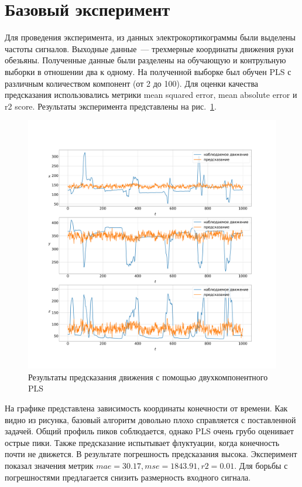 \section{Базовый эксперимент}
Для проведения эксперимента, из данных электрокортикограммы были выделены частоты сигналов. Выходные данные~--- трехмерные координаты движения руки обезьяны. Полученные данные были разделены на обучающую и контрульную выборки в отношении два к одному. На полученной выборке был обучен PLS с различным количеством компонент (от 2 до 100). Для оценки качества предсказания использовались метрики mean squared error, mean absolute error и r2 score. Результаты эксперимента представлены на рис.~\ref{fig:baseAlgo}.
\begin{figure}
  \begin{center}
    \includegraphics[width=\textwidth]{base_algo.pdf}
    \caption{Результаты предсказания движения с помощью двухкомпонентного PLS}
    \label{fig:baseAlgo}
  \end{center}
\end{figure}
На графике представлена зависимость координаты конечности от времени. Как видно из рисунка, базовый алгоритм довольно плохо справляется с поставленной задачей. Общий профиль пиков соблюдается, однако PLS очень грубо оценивает острые пики. Также предсказание испытывает флуктуации, когда конечность почти не движется. В результате погрешность предсказания высока. Эксперимент показал значения метрик $mae = 30.17, mse = 1843.91, r2 = 0.01$. Для борьбы с погрешностями предлагается снизить размерность входного сигнала.
